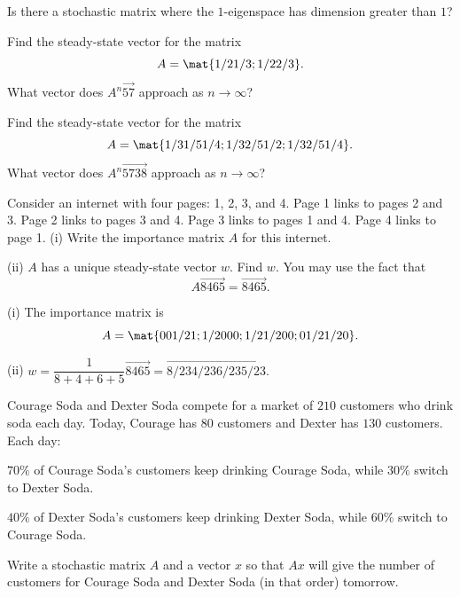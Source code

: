 \begin{problems}
\problem %
Is there a stochastic matrix where the $1$-eigenspace has dimension greater than $1$?

\problem %
Find the steady-state vector for the matrix
\[A = \mat{1/2 1/3; 1/2 2/3}.\]
What vector does $A^n \vec{5 7}$ approach as $n \to \infty$?


\problem %
Find the steady-state vector for the matrix
\[A = \mat{1/3 1/5 1/4; 1/3 2/5 1/2; 1/3 2/5 1/4}.\]
What vector does $A^n \vec{5 7 38}$ approach as $n \to \infty$?

\problem %
  Consider an internet with four pages: 1, 2, 3, and 4.
\newline
Page 1 links to pages 2 and 3. \newline
Page 2 links to pages 3 and 4. \newline
Page 3 links to pages 1 and 4. \newline
Page 4 links to page 1.
\newline \newline
(i) Write the importance matrix $A$ for this internet.

\noindent (ii) $A$ has a unique steady-state vector $w$.  Find $w$.  You may use the fact
that \[A \vec{8 4 6 5} = \vec{8 4 6 5}.\]

\begin{solution}
  (i) The importance matrix is
    \[A = \mat{0 0 1/2 1; 1/2 0 0 0; 1/2 1/2 0 0; 0 1/2 1/2 0} .\]
    
  (ii) $w=\dfrac{1}{8+4+6+5} \vec{8 4 6 5} = \vec{8/23 4/23 6/23 5/23}.$

\end{solution}

\problem
Courage Soda and Dexter Soda compete for a market of $210$ customers
who drink soda each day.  \newline
Today, Courage has $80$ customers and Dexter has $130$ customers.
Each day:

	$70\%$ of Courage Soda's customers keep drinking 
	Courage Soda, while $30\%$ switch to Dexter Soda.  
	
	$40\%$ of Dexter Soda's customers keep drinking Dexter Soda, while
	$60\%$ switch to Courage Soda.

	\begin{subproblems}
      \subproblem Write a stochastic matrix $A$ and a vector $x$ so
      that $Ax$ will give the number of customers for Courage Soda and
      Dexter Soda (in that order) tomorrow. \newline
      \ifanswers
        \newline
	

\end{subproblems}
\end{problems}
